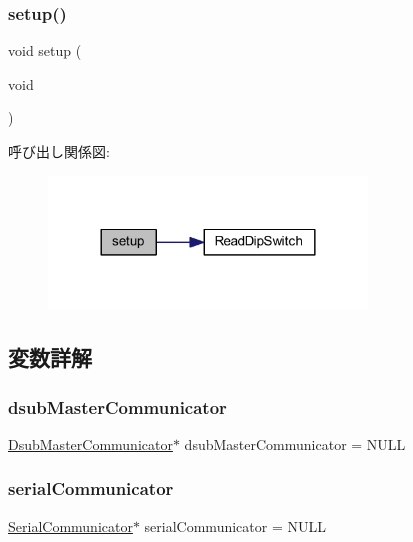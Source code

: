 \subsubsection{\texorpdfstring{setup()}{setup()}}
{\footnotesize\ttfamily void setup (\begin{DoxyParamCaption}\item[{void}]{ }\end{DoxyParamCaption})}

呼び出し関係図\+:
\nopagebreak
\begin{figure}[H]
\begin{center}
\leavevmode
\includegraphics[width=240pt]{start__module_8ino_a7dfd9b79bc5a37d7df40207afbc5431f_cgraph}
\end{center}
\end{figure}


\subsection{変数詳解}
\mbox{\label{start__module_8ino_af3e70438e0875f19cc1cb4cb9f522f80}} 
\subsubsection{\texorpdfstring{dsubMasterCommunicator}{dsubMasterCommunicator}}
{\footnotesize\ttfamily \mbox{\hyperlink{class_dsub_master_communicator}{Dsub\+Master\+Communicator}}$\ast$ dsub\+Master\+Communicator = N\+U\+LL}

\mbox{\label{start__module_8ino_a432be7f3eee18ba7ccdf2ab1d8908ae1}} 
\subsubsection{\texorpdfstring{serialCommunicator}{serialCommunicator}}
{\footnotesize\ttfamily \mbox{\hyperlink{class_serial_communicator}{Serial\+Communicator}}$\ast$ serial\+Communicator = N\+U\+LL}

